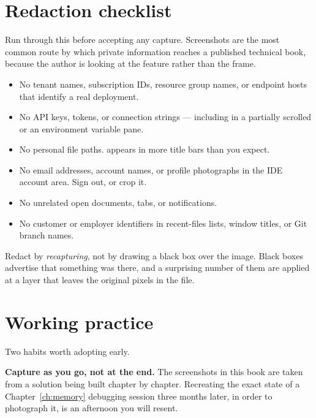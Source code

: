 \section{Redaction checklist}

Run through this before accepting any capture. Screenshots are the most common
route by which private information reaches a published technical book, because
the author is looking at the feature rather than the frame.

\begin{itemize}[leftmargin=1.4em]
\item No tenant names, subscription IDs, resource group names, or endpoint hosts
      that identify a real deployment.
\item No API keys, tokens, or connection strings --- including in a partially
      scrolled  or an environment variable pane.
\item No personal file paths. 
      appears in more title bars than you expect.
\item No email addresses, account names, or profile photographs in the IDE
      account area. Sign out, or crop it.
\item No unrelated open documents, tabs, or notifications.
\item No customer or employer identifiers in recent-files lists, window titles,
      or Git branch names.
\end{itemize}

\begin{warning}
Redact by \emph{recapturing}, not by drawing a black box over the image. Black
boxes advertise that something was there, and a surprising number of them are
applied at a layer that leaves the original pixels in the file.
\end{warning}

\section{Working practice}

Two habits worth adopting early.

\textbf{Capture as you go, not at the end.} The screenshots in this book are
taken from a solution being built chapter by chapter. Recreating the exact state
of a Chapter~\ref{ch:memory} debugging session three months later, in order to
photograph it, is an afternoon you will resent.

